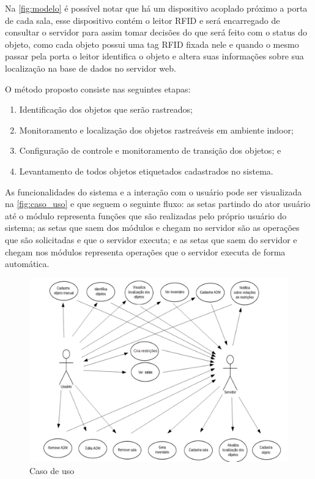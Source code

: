 \par
Na \autoref{fig:modelo} é possível notar que há um dispositivo acoplado próximo a
porta de cada sala, esse dispositivo contém o leitor RFID e será encarregado de consultar o
servidor para assim tomar decisões do que será feito com o status do objeto, como cada objeto possui uma tag RFID fixada
nele e quando o mesmo passar pela porta o leitor identifica o objeto e altera suas informações sobre sua localização na base de dados no servidor web.

\par
O método proposto consiste nas seguintes etapas:
\begin{enumerate}
    \item Identificação dos objetos que serão rastreados;
    \item Monitoramento e localização dos objetos rastreáveis em ambiente indoor; 
    \item Configuração de controle e monitoramento de transição dos objetos; e
    \item Levantamento de todos objetos etiquetados cadastrados no sistema.
\end{enumerate}

\par
As funcionalidades do sistema e a interação com o usuário pode ser visualizada na \autoref{fig:caso_uso} e que seguem o seguinte fluxo:  as setas partindo do ator usuário até o módulo representa funções que são realizadas pelo próprio usuário do sistema; 
as setas que saem dos módulos e chegam no servidor são as operações que são solicitadas e que o servidor executa; e 
as setas que saem do servidor e chegam nos módulos representa operações que o servidor executa de forma automática.
\begin{figure}[H]
              \caption{\label{fig:caso_uso}{Caso de uso}}
              \centering
              \includegraphics[width=1.1\textwidth]{Figuras/caso_de_uso.png}
        \end{figure}
%
%
